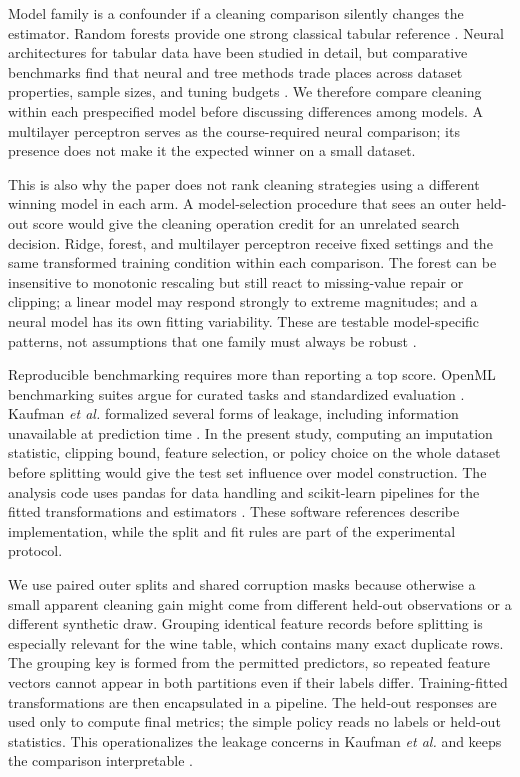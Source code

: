 \documentclass[conference]{IEEEtran}
\begin{document}
Model family is a confounder if a cleaning comparison silently changes the estimator. Random forests provide one strong classical tabular reference \cite{Breiman2001}. Neural architectures for tabular data have been studied in detail, but comparative benchmarks find that neural and tree methods trade places across dataset properties, sample sizes, and tuning budgets \cite{Gorishniy2021,Grinsztajn2022,McElfresh2023}. We therefore compare cleaning within each prespecified model before discussing differences among models. A multilayer perceptron serves as the course-required neural comparison; its presence does not make it the expected winner on a small dataset.

This is also why the paper does not rank cleaning strategies using a different winning model in each arm. A model-selection procedure that sees an outer held-out score would give the cleaning operation credit for an unrelated search decision. Ridge, forest, and multilayer perceptron receive fixed settings and the same transformed training condition within each comparison. The forest can be insensitive to monotonic rescaling but still react to missing-value repair or clipping; a linear model may respond strongly to extreme magnitudes; and a neural model has its own fitting variability. These are testable model-specific patterns, not assumptions that one family must always be robust \cite{Breiman2001,Gorishniy2021,Grinsztajn2022}.

Reproducible benchmarking requires more than reporting a top score. OpenML benchmarking suites argue for curated tasks and standardized evaluation \cite{Bischl2021}. Kaufman \emph{et al.} formalized several forms of leakage, including information unavailable at prediction time \cite{Kaufman2012}. In the present study, computing an imputation statistic, clipping bound, feature selection, or policy choice on the whole dataset before splitting would give the test set influence over model construction. The analysis code uses pandas for data handling and scikit-learn pipelines for the fitted transformations and estimators \cite{McKinney2010,Pedregosa2011}. These software references describe implementation, while the split and fit rules are part of the experimental protocol.

We use paired outer splits and shared corruption masks because otherwise a small apparent cleaning gain might come from different held-out observations or a different synthetic draw. Grouping identical feature records before splitting is especially relevant for the wine table, which contains many exact duplicate rows. The grouping key is formed from the permitted predictors, so repeated feature vectors cannot appear in both partitions even if their labels differ. Training-fitted transformations are then encapsulated in a pipeline. The held-out responses are used only to compute final metrics; the simple policy reads no labels or held-out statistics. This operationalizes the leakage concerns in Kaufman \emph{et al.} and keeps the comparison interpretable \cite{Kaufman2012,Pedregosa2011}.
\end{document}
